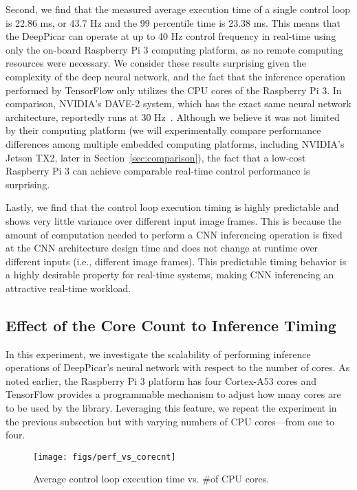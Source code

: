 Second, we find that the measured average
execution time of a single control loop is 22.86 ms, or 43.7 Hz and
the 99 percentile time is 23.38 ms.
This means that the DeepPicar can operate
at up to 40 Hz control frequency in real-time using only the on-board
Raspberry Pi 3 computing platform, as no remote computing resources
were necessary. We consider these results surprising given the complexity
of the deep neural network, and the fact that the inference operation
performed by TensorFlow only utilizes the CPU cores of the Raspberry Pi 3.
In comparison, NVIDIA's DAVE-2 system, which has the exact same neural
network architecture, reportedly runs at 30 Hz~\cite{Bojarski2016}.
Although we believe it was not
limited by their computing platform (we will experimentally compare
performance differences among multiple embedded computing platforms,
including NVIDIA's Jetson TX2, later in
Section~\ref{sec:comparison}), the fact that a low-cost
Raspberry Pi 3 can achieve comparable real-time control performance is
surprising.

Lastly, we find that the control loop execution timing is highly
predictable and shows very little variance over different input image
frames. This is because the amount of computation needed to perform
a CNN inferencing operation is fixed at the CNN architecture design
time and does not change at runtime over different inputs (i.e.,
different image frames). This predictable timing behavior is a highly
desirable property for real-time systems, making CNN inferencing an
attractive real-time workload.

\subsection{Effect of the Core Count to Inference Timing}

In this experiment, we investigate the scalability of performing
inference operations of DeepPicar's neural network with respect to the
number of cores. As noted earlier, the Raspberry Pi 3 platform has
four Cortex-A53 cores and TensorFlow
provides a programmable mechanism to adjust how many cores are to be
used by the library. Leveraging this feature, we repeat the
experiment in the previous subsection but with varying
numbers of CPU cores---from one to four.

\begin{figure}[h]
  \centering
  \texttt{[image: figs/perf\_vs\_corecnt]}
  \caption{Average control loop execution time vs. \#of CPU
    cores.}
  \label{fig:perf-vs-corecnt}
\end{figure}

